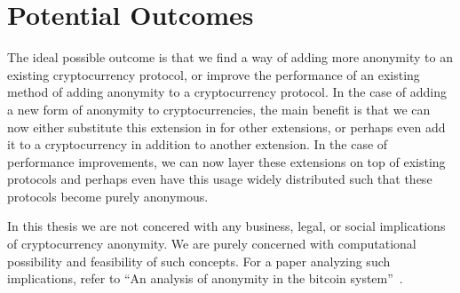 \documentclass[11pt]{artikel3}
\begin{document}
\section{Potential Outcomes}
The ideal possible outcome is that we find a way of adding more anonymity to an
existing cryptocurrency protocol, or improve the performance of an existing
method of adding anonymity to a cryptocurrency protocol. In the case of adding
a new form of anonymity to cryptocurrencies, the main
benefit is that we can now either substitute this extension in for other
extensions, or perhaps even add it to a cryptocurrency in addition to another
extension. In the case of performance improvements, we can now layer these
extensions on top of existing protocols and perhaps even have this usage widely
distributed such that these protocols become purely anonymous.

In this thesis we are not concered with any business, legal, or social
implications of cryptocurrency anonymity. We are purely concerned with
computational possibility and feasibility of such concepts. For a paper
analyzing such implications, refer to ``An analysis of anonymity in the bitcoin
system''~\cite{Reid11}.



\end{document}
